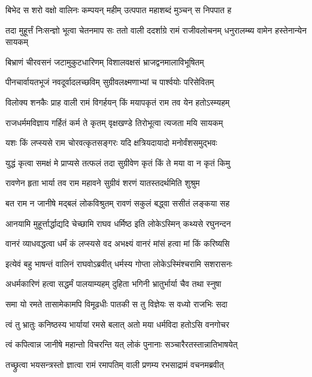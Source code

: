 \twolineshloka
{बिभेद स शरो वक्षो वालिनः कम्पयन् महीम्}
{उत्पपात महाशब्दं मुञ्चन् स निपपात ह} %

\threelineshloka
{तदा मुहूर्त्तं निःसन्ज्ञो भूत्वा चेतनमाप सः}
{ततो वाली ददर्शाग्रे रामं राजीवलोचनम्}
{धनुरालम्ब्य वामेन हस्तेनान्येन सायकम्} %

\twolineshloka
{बिभ्राणं चीरवसनं जटामुकुटधारिणम्}
{विशालवक्षसं भ्राजद्वनमालाविभूषितम्} %

\twolineshloka
{पीनचार्वायतभूजं नवदूर्वादलच्छविम्}
{सुग्रीवलक्ष्मणाभ्यां च पार्श्वयोः परिसेवितम्} %

\twolineshloka
{विलोक्य शनकैः प्राह वाली रामं विगर्हयन्}
{किं मयापकृतं राम तव येन हतोऽस्म्यहम्} %

\twolineshloka
{राजधर्ममविज्ञाय गर्हितं कर्म ते कृतम्}
{वृक्षखण्डे तिरोभूत्वा त्यजता मयि सायकम्} %

\twolineshloka
{यशः किं लप्स्यसे राम चोरवत्कृतसङ्गरः}
{यदि क्षत्रियदायादो मनोर्वंशसमुद्भवः} %

\twolineshloka
{युद्धं कृत्वा समक्षं मे प्राप्यसे तत्फलं तदा}
{सुग्रीवेण कृतं किं ते मया वा न कृतं किमु} %

\twolineshloka
{रावणेन हृता भार्या तव राम महावने}
{सुग्रीवं शरणं यातस्तदर्थमिति शुश्रुम} %

\twolineshloka
{बत राम न जानीषे मद्बलं लोकविश्रुतम्}
{रावणं सकुलं बद्ध्वा ससीतं लङ्कया सह} %

\twolineshloka
{आनयामि मुहूर्त्तार्द्धाद्यदि चेच्छामि राघव}
{धर्मिष्ठ इति लोकेऽस्मिन् कथ्यसे रघुनन्दन} %

\twolineshloka
{वानरं व्याधवद्धत्वा धर्मं कं लप्स्यसे वद}
{अभक्ष्यं वानरं मांसं हत्वा मां किं करिष्यसि} %

\twolineshloka
{इत्येवं बहु भाषन्तं वालिनं राघवोऽब्रवीत्}
{धर्मस्य गोप्ता लोकेऽस्मिंश्चरामि सशरासनः} %

\twolineshloka
{अधर्मकारिणं हत्वा सद्धर्मं पालयाम्यहम्}
{दुहिता भगिनी भ्रातुर्भार्या चैव तथा स्नुषा} %

\twolineshloka
{समा यो रमते तासामेकामपि विमूढधीः}
{पातकी स तु विज्ञेयः स वध्यो राजभिः सदा} %

\twolineshloka
{त्वं तु भ्रातुः कनिष्ठस्य भार्यायां रमसे बलात्}
{अतो मया धर्मविदा हतोऽसि वनगोचर} %

\twolineshloka
{त्वं कपित्वान्न जानीषे महान्तो विचरन्ति यत्}
{लोकं पुनानाः सञ्चारैरतस्तान्नातिभाषयेत्} %

\twolineshloka
{तच्छ्रुत्वा भयसन्त्रस्तो ज्ञात्वा रामं रमापतिम्}
{वाली प्रणम्य रभसाद्रामं वचनमब्रवीत्} %

